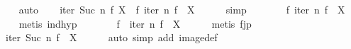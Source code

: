 \begin{isabellebody}
\ \ \ \ \isamarkupfalse%
\ auto\isanewline
\ \ \isamarkupfalse%
\ {}iter\ {}Suc\ n{}\ f\ {}{}X{}\ {}\ f\ {}iter\ n\ f\ {}{}\ X{}{}{}\isanewline
\ \ \ \ \isamarkupfalse%
\ simp\isanewline
\ \ \isamarkupfalse%
\ \isamarkupfalse%
\ {}{}{}{}\ {}\ f\ {}{}iter\ n\ f\ {}\ X{}{}\isanewline
\ \ \ \ \isamarkupfalse%
\ {}metis\ ind{}hyp{}{}\isanewline
\ \ \isamarkupfalse%
\ \isamarkupfalse%
\ {}{}{}{}\ {}\ {}f\ {}\ iter\ n\ f\ {}\ X{}\isanewline
\ \ \ \ \isamarkupfalse%
\ {}metis\ f{}jp{}\isanewline
\ \ \isamarkupfalse%
\ \isamarkupfalse%
\ {}{}{}{}\ {}\ {}iter\ {}Suc\ n{}\ f\ {}\ X{}\isanewline
\ \ \ \ \isamarkupfalse%
\ {}auto\ simp\ add{}\ image{}def{}\isanewline

\end{isabellebody}

